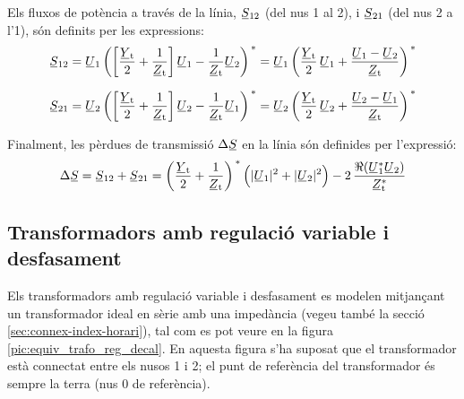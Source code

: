 Els fluxos de potència a través de la línia, $\cmplx{S}_{12}$ (del
nus 1 al 2), i $\cmplx{S}_{21}$ (del nus 2 a l'1), són definits per
les expressions:
\begin{align}
   \cmplx{S}_{12} &= \cmplx{U}_1 \left( \left[ \frac{\cmplx{Y}\ped{t}}{2} + \frac{1}{\cmplx{Z}\ped{t}} \right] \cmplx{U}_1 - \frac{1}{\cmplx{Z}\ped{t}} \cmplx{U}_2 \right)^{\,*} = \cmplx{U}_1 \left( \frac{\cmplx{Y}\ped{t}}{2}\, \cmplx{U}_1 + \frac{\cmplx{U}_1 - \cmplx{U}_2}{\cmplx{Z}\ped{t}} \right)^{\,*} \label{eq:lin_s12}
   \\[1.5ex]
   \cmplx{S}_{21} &= \cmplx{U}_2 \left( \left[ \frac{\cmplx{Y}\ped{t}}{2} + \frac{1}{\cmplx{Z}\ped{t}} \right] \cmplx{U}_2 - \frac{1}{\cmplx{Z}\ped{t}} \cmplx{U}_1 \right)^{\,*} = \cmplx{U}_2 \left( \frac{\cmplx{Y}\ped{t}}{2} \,\cmplx{U}_2 + \frac{\cmplx{U}_2 - \cmplx{U}_1}{\cmplx{Z}\ped{t}} \right)^{\,*} \label{eq:lin_s21}
\end{align}

Finalment, les pèrdues de transmissió $\Delta\cmplx{S}$ en la  línia són definides per
l'expressió:
\begin{equation}
   \Delta\cmplx{S} = \cmplx{S}_{12} + \cmplx{S}_{21} = \left( \frac{\cmplx{Y}\ped{t}}{2} + \frac{1}{\cmplx{Z}\ped{t}} \right)^{\,*} \Big( |\cmplx{U}_1|^2 + |\cmplx{U}_2|^2 \Big) - 2 \, \frac{\Re (\cmplx{U}_1^* \cmplx{U}_2)}{\cmplx{Z}\ped{t}^*}
\end{equation}

\subsection{Transformadors amb regulació variable i desfasament}

Els transformadors amb regulació variable i desfasament es modelen
mitjançant un transformador ideal en sèrie amb una impedància
(vegeu també la secció \ref{sec:connex-index-horari}), tal
com es pot veure en la figura \vref{pic:equiv_trafo_reg_decal}. En
aquesta figura s'ha suposat que el transformador està connectat
entre els nusos 1 i 2; el punt de referència del transformador és
sempre  la terra (nus 0 de referència). 

\begin{center}
    
    \label{pic:equiv_trafo_reg_decal}
\end{center}

